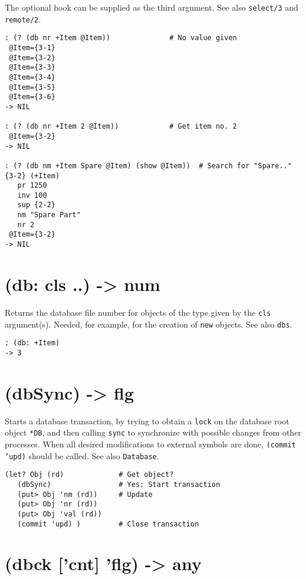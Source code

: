 {{The optional hook can be supplied as the third argument. See also
\texttt{select/3} and \texttt{remote/2}.


\begin{verbatim}
: (? (db nr +Item @Item))              # No value given
 @Item={3-1}
 @Item={3-2}
 @Item={3-3}
 @Item={3-4}
 @Item={3-5}
 @Item={3-6}
-> NIL

: (? (db nr +Item 2 @Item))            # Get item no. 2
 @Item={3-2}
-> NIL

: (? (db nm +Item Spare @Item) (show @Item))  # Search for "Spare.."
{3-2} (+Item)
   pr 1250
   inv 100
   sup {2-2}
   nm "Spare Part"
   nr 2
 @Item={3-2}
-> NIL
\end{verbatim}

 
\section{(db: cls ..) -> num}
\label{sec-8-1-4-15}


Returns the database file number for objects of the type given by the
\texttt{cls} argument(s). Needed, for example, for the creation of \texttt{new}
objects. See also \texttt{dbs}.


\begin{verbatim}
: (db: +Item)
-> 3
\end{verbatim}

 
\section{(dbSync) -> flg}
\label{sec-8-1-4-16}


Starts a database transaction, by trying to obtain a \texttt{lock} on the
database root object \texttt{*DB}, and then calling \texttt{sync} to synchronize with
possible changes from other processes. When all desired modifications to
external symbols are done, \texttt{(commit 'upd)} should be called. See also
\texttt{Database}.


\begin{verbatim}
(let? Obj (rd)             # Get object?
   (dbSync)                # Yes: Start transaction
   (put> Obj 'nm (rd))     # Update
   (put> Obj 'nr (rd))
   (put> Obj 'val (rd))
   (commit 'upd) )         # Close transaction
\end{verbatim}

 
\section{(dbck ['cnt] 'flg) -> any}
\label{sec-8-1-4-17}


}}
